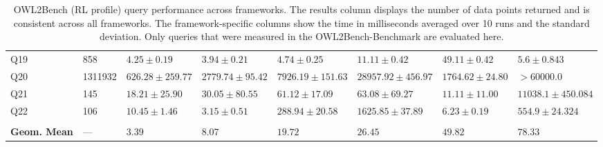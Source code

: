 \documentclass{article}
\begin{document}
\begin{table}[t]
{\begin{tabular}{llllllll}
Q19 & 858 & $4.25 \pm 0.19$ & $\mathbf{3.94 \pm 0.21}$ & $4.74 \pm 0.25$ & $11.11 \pm 0.42$ & $49.11 \pm 0.42$  & $5.6 \pm 0.843$\\
Q20 & 1311932 & $\mathbf{626.28 \pm 259.77}$ & $2779.74 \pm 95.42$ & $7926.19 \pm 151.63$ & $28957.92 \pm 456.97$ & $1764.62 \pm 24.80$ & $>60000.0$\\
Q21 & 145 & $18.21 \pm 25.90$ & $30.05 \pm 80.55$ & $61.12 \pm 17.09$ & $63.08 \pm 69.27$ & $\mathbf{11.11 \pm 11.00}$ & $11038.1 \pm 450.084$ \\
Q22 & 106 & $10.45 \pm 1.46$ & $\mathbf{3.15 \pm 0.51}$ & $288.94 \pm 20.58$ & $1625.85 \pm 37.89$ & $6.23 \pm 0.19$ & $554.9 \pm 24.324$ \\
\hline \\
\textbf{Geom. Mean} & --- & $\mathbf{3.39}$ & $8.07$ & $19.72$ & $26.45$ & $49.82$ & $78.33$ \\
\hline
\end{tabular}
}
  \caption{OWL2Bench (RL profile) query performance across frameworks. The results column displays the number of data points returned and is consistent across all frameworks. The framework-specific columns show the time in milliseconds averaged over 10 runs and the standard deviation. Only queries that were measured in the OWL2Bench-Benchmark \cite{singh2020owl2bench} are evaluated here.}
  \label{tab:queries}
\end{table}




\end{document}
